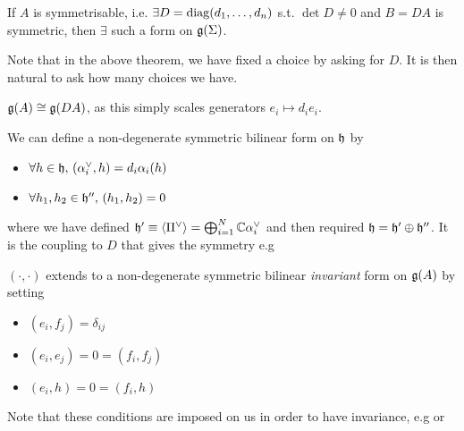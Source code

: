 \documentclass{article}
\begin{document}
\begin{theorem}
If $A$ is symmetrisable, i.e. $\exists D = \operatorname{diag}(d_1, \dots, d_n)$ s.t. $\det D \neq 0$ and $B=DA$ is symmetric, then $\exists$ such a form on $\mathfrak{g}(\Sigma)$. 
\end{theorem}

Note that in the above theorem, we have fixed a choice by asking for $D$. It is then natural to ask how many choices we have. 

\begin{example}
$\mathfrak{g}(A) \cong \mathfrak{g}(DA)$, as this simply scales generators $e_i \mapsto d_i e_i$. 
\end{example}

We can define a non-degenerate symmetric bilinear form on $\mathfrak{h}$ by 
\begin{itemize}
    \item $\forall h \in \mathfrak{h}, \, (\alpha_i^\vee,h) = d_i \alpha_i(h)$
    \item $\forall h_1,h_2 \in \mathfrak{h}^{\prime\prime}, \, (h_1, h_2) = 0$
\end{itemize}
where we have defined $\mathfrak{h}^\prime \equiv \left\langle \Pi^\vee \right\rangle = \bigoplus_{i=1}^N \mathbb{C}\alpha_i^\vee$ and then required $\mathfrak{h} = \mathfrak{h}^\prime \oplus \mathfrak{h}^{\prime\prime}$. It is the coupling to $D$ that gives the symmetry e.g 

\begin{theorem}
$(\cdot,\cdot)$ extends to a non-degenerate symmetric bilinear \emph{invariant} form on $\mathfrak{g}(A)$ by setting 
\begin{itemize}
    \item $(e_i,f_j) = \delta_{ij}$
    \item $(e_i,e_j) = 0 = (f_i,f_j)$
    \item $(e_i,h) = 0 = (f_i,h)$
\end{itemize}
\end{theorem}

\begin{remark}
Note that these conditions are imposed on us in order to have invariance, e.g 
or 
\end{remark}
\end{document}
